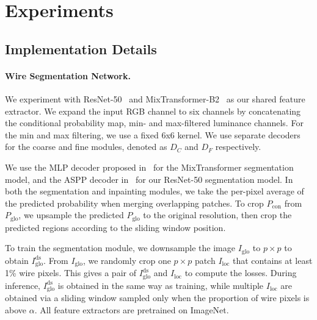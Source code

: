 \section{Experiments} \label{sec:results}

\subsection{Implementation Details}
\paragraph{Wire Segmentation Network.}
We experiment with ResNet-50~\cite{resnet} and MixTransformer-B2~\cite{segformer} as our shared feature extractor. We expand the input RGB channel to six channels by concatenating the conditional probability map, min- and max-filtered luminance channels. For the min and max filtering, we use a fixed 6x6 kernel. We use separate decoders for the coarse and fine modules, denoted as $D_C$ and $D_F$ respectively.

We use the MLP decoder proposed in~\cite{segformer} for the MixTransformer segmentation model, and the ASPP decoder in~\cite{deeplabv3p} for our ResNet-50 segmentation model. In both the segmentation and inpainting modules, we take the per-pixel average of the predicted probability when merging overlapping patches. To crop $P_\mathrm{con}$ from $P_\mathrm{glo}$, we upsample the predicted $P_\mathrm{glo}$ to the original resolution, then crop the predicted regions according to the sliding window position.

To train the segmentation module, we downsample the image $I_\mathrm{glo}$ to $p\times p$ to obtain $I_\mathrm{glo}^\mathrm{ds}$. From $I_\mathrm{glo}$, we randomly crop one $p\times p$ patch $I_\mathrm{loc}$ that contains at least 1\% wire pixels. This gives a pair of $I_\mathrm{glo}^\mathrm{ds}$ and $I_\mathrm{loc}$ to compute the losses. During inference, $I_\mathrm{glo}^\mathrm{ds}$ is obtained in the same way as training, while multiple $I_\mathrm{loc}$ are obtained via a sliding window sampled only when the proportion of wire pixels is above $\alpha$. All feature extractors are pretrained on ImageNet.

